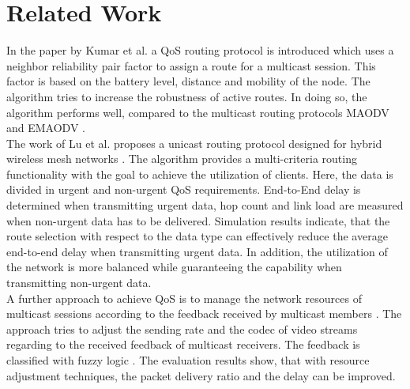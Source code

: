 \documentclass[runningheads]{llncs}
\newcommand{\MANET}{MANET}
\newcommand{\QOS}{QoS}
\newcommand{\VOIP}{VoIP}
\begin{document}
	\section{Related Work}
	In the paper by Kumar et al. \cite{RelatedWork:QMRPRNS} a \QOS{} routing protocol is introduced which uses a neighbor reliability pair factor to assign a route for a multicast session. This factor is based on the battery level, distance and mobility of the node. The algorithm tries to increase the robustness of active routes. In doing so, the algorithm performs well, compared to the multicast routing protocols MAODV \cite{RelatedWork:MAODV} and EMAODV \cite{RelatedWork:EMAODV}.\\
	The work of Lu et al. \cite{RelatedWork:QoSWMN} proposes a unicast routing protocol designed for hybrid wireless mesh networks \cite{RelatedWorkContent:WMN}. The algorithm provides a multi-criteria routing functionality with the goal to achieve the utilization of clients. Here, the data is divided in urgent and non-urgent \QOS{} requirements. End-to-End delay is determined when transmitting urgent data, hop count and link load are measured when non-urgent data has to be delivered. Simulation results indicate, that the route selection with respect to the data type can effectively reduce the average end-to-end delay when transmitting urgent data. In addition, the utilization of the network is more balanced while guaranteeing the capability when transmitting non-urgent data.\\
	A further approach to achieve \QOS{} is to manage the network resources of multicast sessions according to the  feedback received by multicast members \cite{ReleatedWork:QoSSessionAdaptation}. The approach tries to adjust the sending rate and the codec of video streams regarding to the received feedback of multicast receivers. The feedback is classified with fuzzy logic \cite{RelatedWorkContent:QoSSessionAdaptationFuzzySets}\cite{RelatedWorkContent:QoSSessionAdaptationFuzzySets2}. The evaluation results show, that with resource adjustment techniques, the packet delivery ratio and the delay can be improved.
\end{document}
